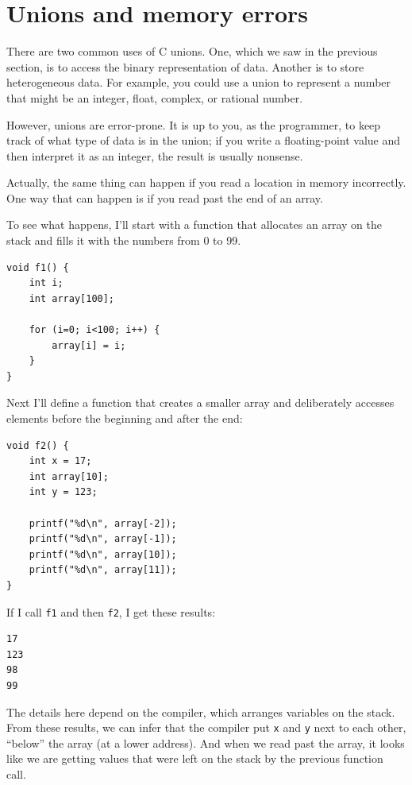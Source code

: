 \documentclass[12pt]{book}
\begin{document}
{\section{Unions and memory errors}

There are two common uses of C unions.  One, which we saw in the
previous section, is to access the binary representation of data.
Another is to store heterogeneous data.  For example, you could
use a union to represent a number that might be an integer, float,
complex, or rational number.

However, unions are error-prone.  It is up to you, as the programmer,
to keep track of what type of data is in the union; if you write
a floating-point value and then interpret it as an integer, the result
is usually nonsense.

Actually, the same thing can happen if you read a location in memory
incorrectly.  One way that can happen is if you read past the end of
an array.

To see what happens, I'll start with a function that allocates an
array on the stack and fills it with the numbers from 0 to 99.

\begin{verbatim}
void f1() {
    int i;
    int array[100];

    for (i=0; i<100; i++) {
        array[i] = i;
    }
}
\end{verbatim}

Next I'll define a function that creates a smaller array and
deliberately accesses elements before the beginning and after
the end:

\begin{verbatim}
void f2() {
    int x = 17;
    int array[10];
    int y = 123;

    printf("%d\n", array[-2]);
    printf("%d\n", array[-1]);
    printf("%d\n", array[10]);
    printf("%d\n", array[11]);
}
\end{verbatim}

If I call {\tt f1} and then {\tt f2}, I get these results:

\begin{verbatim}
17
123
98
99
\end{verbatim}

The details here depend on the compiler, which arranges variables
on the stack.  From these results, we can infer that the
compiler put {\tt x} and {\tt y} next to each other, ``below''
the array (at a lower address).  And when we read past the
array, it looks like we are getting values that were left on
the stack by the previous function call.

}
\end{document}
